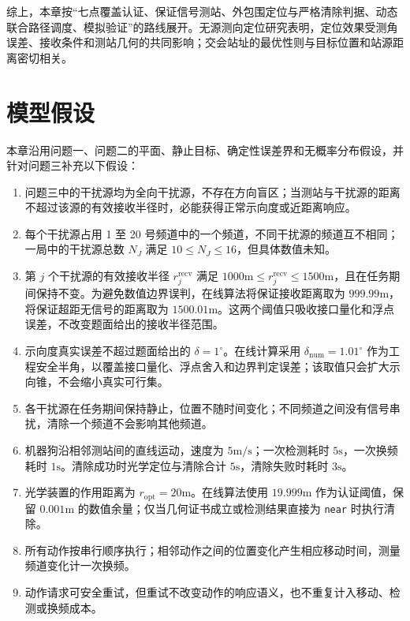 综上，本章按“七点覆盖认证、保证信号测站、外包围定位与严格清除判据、动态联合路径调度、模拟验证”的路线展开。无源测向定位研究表明，定位效果受测角误差、接收条件和测站几何的共同影响\cite{wang2019,zheng2014,uav2019}；交会站址的最优性则与目标位置和站源距离密切相关\cite{dogancay2005,bishop2010}。

\section{模型假设}

本章沿用问题一、问题二的平面、静止目标、确定性误差界和无概率分布假设，并针对问题三补充以下假设：

\begin{enumerate}
\item 问题三中的干扰源均为全向干扰源，不存在方向盲区；当测站与干扰源的距离不超过该源的有效接收半径时，必能获得正常示向度或近距离响应。
\item 每个干扰源占用 1 至 20 号频道中的一个频道，不同干扰源的频道互不相同；一局中的干扰源总数 $N_J$ 满足 $10\le N_J\le16$，但具体数值未知。
\item 第 $j$ 个干扰源的有效接收半径 $r_j^{\mathrm{recv}}$ 满足 $1000\mathrm{m}\le r_j^{\mathrm{recv}}\le1500\mathrm{m}$，且在任务期间保持不变。为避免数值边界误判，在线算法将保证接收距离取为 $999.99\mathrm{m}$，将保证超距无信号的距离取为 $1500.01\mathrm{m}$。这两个阈值只吸收接口量化和浮点误差，不改变题面给出的接收半径范围。
\item 示向度真实误差不超过题面给出的 $\delta=1^\circ$。在线计算采用 $\delta_{\mathrm{num}}=1.01^\circ$ 作为工程安全半角，以覆盖接口量化、浮点舍入和边界判定误差；该取值只会扩大示向锥，不会缩小真实可行集。
\item 各干扰源在任务期间保持静止，位置不随时间变化；不同频道之间没有信号串扰，清除一个频道不会影响其他频道。
\item 机器狗沿相邻测站间的直线运动，速度为 $5\mathrm{m/s}$；一次检测耗时 $5\mathrm{s}$，一次换频耗时 $1\mathrm{s}$。清除成功时光学定位与清除合计 $5\mathrm{s}$，清除失败时耗时 $3\mathrm{s}$。
\item 光学装置的作用距离为 $r_{\mathrm{opt}}=20\mathrm{m}$。在线算法使用 $19.999\mathrm{m}$ 作为认证阈值，保留 $0.001\mathrm{m}$ 的数值余量；仅当几何证书成立或检测结果直接为 \texttt{near} 时执行清除。
\item 所有动作按串行顺序执行；相邻动作之间的位置变化产生相应移动时间，测量频道变化计一次换频。
\item 动作请求可安全重试，但重试不改变动作的响应语义，也不重复计入移动、检测或换频成本。
\end{enumerate}

